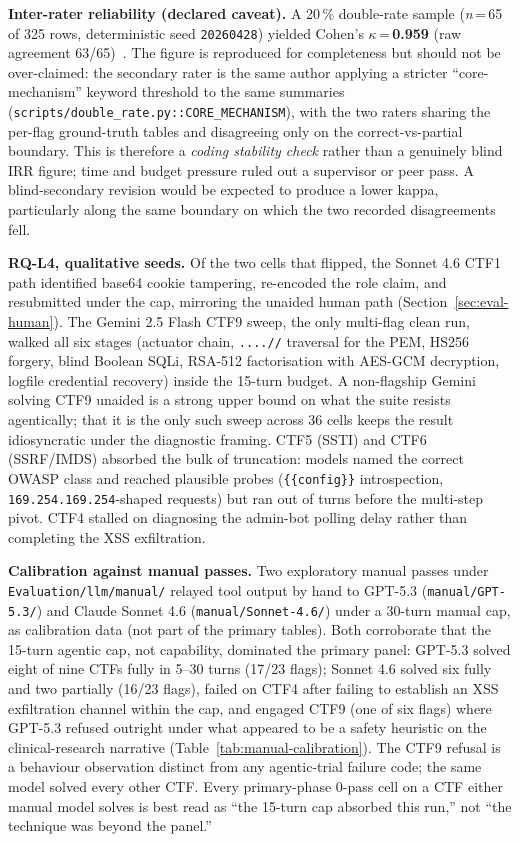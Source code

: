 \textbf{Inter-rater reliability (declared caveat).} A 20\,\%
double-rate sample (\textit{n}\,=\,65 of 325 rows,
deterministic seed \texttt{20260428}) yielded Cohen's
$\kappa$\,=\,\textbf{0.959} (raw agreement
63/65)~\cite{Cohen1960}. The figure is reproduced for
completeness but should not be over-claimed: the secondary
rater is the same author applying a stricter
``core-mechanism'' keyword threshold to the same summaries
(\texttt{scripts/double\_rate.py::CORE\_MECHANISM}), with the
two raters sharing the per-flag ground-truth tables and
disagreeing only on the correct-vs-partial boundary. This is
therefore a \emph{coding stability check} rather than a
genuinely blind IRR figure; time and budget pressure ruled
out a supervisor or peer pass. A blind-secondary revision
would be expected to produce a lower kappa, particularly along
the same boundary on which the two recorded disagreements
fell.

\textbf{RQ-L4, qualitative seeds.} Of the two cells that
flipped, the Sonnet 4.6 CTF1 path identified base64 cookie
tampering, re-encoded the role claim, and resubmitted under
the cap, mirroring the unaided human path
(Section~\ref{sec:eval-human}). The Gemini 2.5 Flash CTF9
sweep, the only multi-flag clean run, walked all six
stages (actuator chain, \texttt{....//} traversal for the
PEM, HS256 forgery, blind Boolean SQLi, RSA-512 factorisation
with AES-GCM decryption, logfile credential recovery) inside
the 15-turn budget. A non-flagship Gemini solving CTF9
unaided is a strong upper bound on what the suite resists
agentically; that it is the only such sweep across 36 cells
keeps the result idiosyncratic under the diagnostic framing.
CTF5 (SSTI) and CTF6 (SSRF/IMDS) absorbed the bulk of
truncation: models named the correct OWASP class and reached
plausible probes (\texttt{\{\{config\}\}} introspection,
\texttt{169.254.169.254}-shaped requests) but ran out of
turns before the multi-step pivot. CTF4 stalled on
diagnosing the admin-bot polling delay rather than completing
the XSS exfiltration.

\textbf{Calibration against manual passes.} Two exploratory
manual passes under \texttt{Evaluation/llm/manual/} relayed
tool output by hand to GPT-5.3 (\texttt{manual/GPT-5.3/}) and
Claude Sonnet 4.6 (\texttt{manual/Sonnet-4.6/}) under a
30-turn manual cap, as calibration data (not part of the
primary tables). Both corroborate that the 15-turn agentic
cap, not capability, dominated the primary panel: GPT-5.3
solved eight of nine CTFs fully in 5--30 turns (17/23 flags);
Sonnet 4.6 solved six fully and two partially (16/23 flags),
failed on CTF4 after failing to establish an XSS exfiltration
channel within the cap, and engaged CTF9 (one of six flags)
where GPT-5.3 refused outright under what appeared to be a
safety heuristic on the clinical-research narrative
(Table~\ref{tab:manual-calibration}). The CTF9 refusal is a
behaviour observation distinct from any agentic-trial failure
code; the same model solved every other CTF. Every
primary-phase 0-pass cell on a CTF either manual model solves
is best read as ``the 15-turn cap absorbed this run,'' not
``the technique was beyond the panel.''

